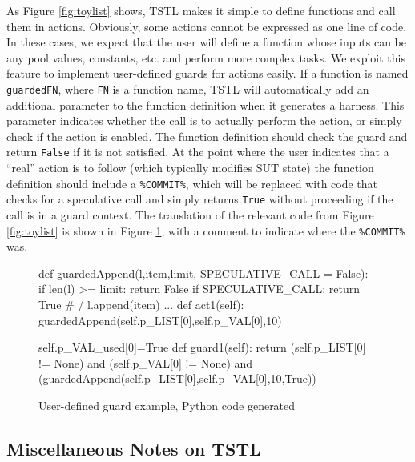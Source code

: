 \documentclass[runningheads,a4paper]{llncs}
\begin{document}
As Figure \ref{fig:toylist} shows, TSTL makes it simple to define
functions and call them in actions.  Obviously, some actions cannot be
expressed as one line of code.  In these cases, we expect that the
user will define a function whose inputs can be any pool values, constants, etc. and perform more complex tasks.  We exploit this
feature to implement user-defined guards for actions easily.  If a
function is named {\tt guardedFN}, where {\tt FN} is a function name,
TSTL will automatically add an additional parameter to the function
definition when it generates a harness.  This parameter indicates
whether the call is to actually perform the action, or simply check if
the action is enabled.  The function definition should check the guard
and return {\tt False} if it is not satisfied.  At the point where the
user indicates that a ``real'' action is to follow (which typically modifies SUT state) the
function definition should include a {\tt \%COMMIT\%}, which will
be replaced with code that checks for a speculative call and simply
returns {\tt True} without proceeding if the call is in a guard
context.  The translation of the
relevant code from Figure \ref{fig:toylist} is shown in Figure
\ref{fig:toyexpand}, with a comment to indicate where the {\tt \%COMMIT\%} was.

\begin{figure}
{\scriptsize
\begin{code}
def guardedAppend(l,item,limit, SPECULATIVE\_CALL = False):
  if len(l) >= limit:
    return False
  if SPECULATIVE\_CALL: return True                                     \# /%
  l.append(item)
...
   def act1(self):
      guardedAppend(self.p\_LIST[0],self.p\_VAL[0],10)

      self.p\_VAL\_used[0]=True
   def guard1(self):
      return (self.p\_LIST[0] != None) and (self.p\_VAL[0] != None) 
        and (guardedAppend(self.p\_LIST[0],self.p\_VAL[0],10,True))

\end{code}
}
\caption{User-defined guard example, Python code generated}
\label{fig:toyexpand}
\vspace{-0.15in}
\end{figure}

\subsection{Miscellaneous Notes on TSTL}
\end{document}
